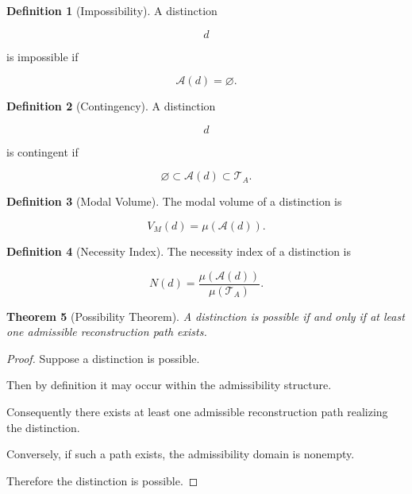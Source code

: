 \documentclass[12pt,oneside]{article}
\newtheorem{theorem}{Theorem}[section] \newtheorem{lemma}[theorem]{Lemma} \newtheorem{proposition}[theorem]{Proposition} \newtheorem{corollary}[theorem]{Corollary}
\theoremstyle{definition}
\newtheorem{definition}[theorem]{Definition} \newtheorem{axiom}[theorem]{Axiom} \newtheorem{remark}[theorem]{Remark} \newtheorem{example}[theorem]{Example}
\begin{document}
\begin{definition}[Impossibility]

A distinction

\[
d
\]

is impossible if

\[
\mathcal A(d)
=
\varnothing.
\]

\end{definition}

\begin{definition}[Contingency]

A distinction

\[
d
\]

is contingent if

\[
\varnothing
\subset
\mathcal A(d)
\subset
\mathcal T_A.
\]

\end{definition}

\begin{definition}[Modal Volume]

The modal volume of a distinction is

\[
V_M(d)
=
\mu(\mathcal A(d)).
\]

\end{definition}

\begin{definition}[Necessity Index]

The necessity index of a distinction is

\[
N(d)
=
\frac{
\mu(\mathcal A(d))
}{
\mu(\mathcal T_A)
}.
\]

\end{definition}

\begin{theorem}[Possibility Theorem]

A distinction is possible if and only if at least one admissible reconstruction path exists.

\end{theorem}

\begin{proof}

Suppose a distinction is possible.

Then by definition it may occur within the admissibility structure.

Consequently there exists at least one admissible reconstruction path realizing the distinction.

Conversely, if such a path exists, the admissibility domain is nonempty.

Therefore the distinction is possible.

\end{proof}
\end{document}
